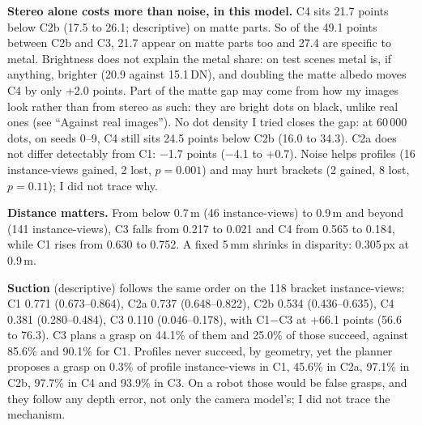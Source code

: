 \documentclass[10pt,a4paper]{article}
\newcommand{\para}[1]{\textbf{#1}\enspace}
\begin{document}
\para{Stereo alone costs more than noise, in this model.} C4 sits 21.7 points below C2b (17.5 to 26.1; descriptive) on matte parts. So of the 49.1 points between C2b and C3, 21.7 appear on matte parts too and 27.4 are specific to metal. Brightness does not explain the metal share: on test scenes metal is, if anything, brighter (20.9 against 15.1\,DN), and doubling the matte albedo moves C4 by only +2.0 points. Part of the matte gap may come from how my images look rather than from stereo as such: they are bright dots on black, unlike real ones (see ``Against real images''). No dot density I tried closes the gap: at 60\,000 dots, on seeds 0--9, C4 still sits 24.5 points below C2b (16.0 to 34.3). C2a does not differ detectably from C1: $-$1.7 points ($-$4.1 to +0.7). Noise helps profiles (16 instance-views gained, 2 lost, $p=0.001$) and may hurt brackets (2 gained, 8 lost, $p=0.11$); I did not trace why.

\para{Distance matters.} From below 0.7\,m (46 instance-views) to 0.9\,m and beyond (141 instance-views), C3 falls from 0.217 to 0.021 and C4 from 0.565 to 0.184, while C1 rises from 0.630 to 0.752. A fixed 5\,mm shrinks in disparity: 0.305\,px at 0.9\,m.

\para{Suction} (descriptive) follows the same order on the 118 bracket instance-views: C1 0.771 (0.673--0.864), C2a 0.737 (0.648--0.822), C2b 0.534 (0.436--0.635), C4 0.381 (0.280--0.484), C3 0.110 (0.046--0.178), with C1$-$C3 at +66.1 points (56.6 to 76.3). C3 plans a grasp on 44.1\% of them and 25.0\% of those succeed, against 85.6\% and 90.1\% for C1. Profiles never succeed, by geometry, yet the planner proposes a grasp on 0.3\% of profile instance-views in C1, 45.6\% in C2a, 97.1\% in C2b, 97.7\% in C4 and 93.9\% in C3. On a robot those would be false grasps, and they follow any depth error, not only the camera model's; I did not trace the mechanism.
\end{document}
